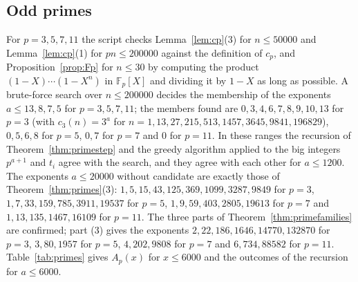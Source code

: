 \documentclass[11pt]{amsart}
\theoremstyle{definition}
\begin{document}
\subsection{Odd primes}
\label{subsec:primes-exp}
For $p=3,5,7,11$ the script checks Lemma~\ref{lem:cp}(3) for $n\le50000$ and Lemma~\ref{lem:cp}(1) for $pn\le200000$ against the definition of $c_p$, and Proposition~\ref{prop:Fp} for $n\le30$ by computing the product $(1-X)\cdots(1-X^n)$ in $\mathbb{F}_p[X]$ and dividing it by $1-X$ as long as possible. A brute-force search over $n\le200000$ decides the membership of the exponents $a\le13,8,7,5$ for $p=3,5,7,11$; the members found are $0,3,4,6,7,8,9,10,13$ for $p=3$ (with $c_3(n)=3^a$ for $n=1,13,27,215,513,1457,3645,9841,196829$), $0,5,6,8$ for $p=5$, $0,7$ for $p=7$ and $0$ for $p=11$. In these ranges the recursion of Theorem~\ref{thm:primestep} and the greedy algorithm applied to the big integers $p^{a+1}$ and $t_i$ agree with the search, and they agree with each other for $a\le1200$. The exponents $a\le20000$ without candidate are exactly those of Theorem~\ref{thm:primes}(3): $1,5,15,43,125,369,1099,3287,9849$ for $p=3$, $1,7,33,159,785,3911,19537$ for $p=5$, $1,9,59,403,2805,19613$ for $p=7$ and $1,13,135,1467,16109$ for $p=11$. The three parts of Theorem~\ref{thm:primefamilies} are confirmed; part (3) gives the exponents $2,22,186,1646,14770,132870$ for $p=3$, $3,80,1957$ for $p=5$, $4,202,9808$ for $p=7$ and $6,734,88582$ for $p=11$. Table~\ref{tab:primes} gives $A_p(x)$ for $x\le6000$ and the outcomes of the recursion for $a\le6000$.
\end{document}
